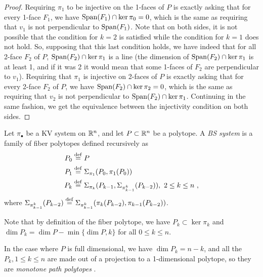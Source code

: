 \begin{proof}
    Requiring $\pi_1$ to be injective on the 1-faces of $P$ is exactly asking that for every 1-face $F_1$, we have $\operatorname{\mathrm{Span}}(F_1)\cap \ker \pi_0=0$, which is the same as requiring that $v_1$ is not perpendicular to $\operatorname{\mathrm{Span}}(F_1)$. 
    Note that on both sides, it is not possible that the condition for $k=2$ is satisfied while the condition for $k=1$ does not hold. 
    So, supposing that this last condition holds, we have indeed that for all 2-face $F_2$ of $P$, $\operatorname{\mathrm{Span}}(F_2)\cap \ker \pi_1$ is a line (the dimension of $\operatorname{\mathrm{Span}}(F_2)\cap \ker \pi_1$ is at least 1, and if it was 2 it would mean that some 1-faces of $F_2$ are perpendicular to $v_1$).
    Requiring that $\pi_1$ is injective on 2-faces of $P$ is exactly asking that for every 2-face $F_2$ of $P$, we have $\operatorname{\mathrm{Span}}(F_2)\cap \ker \pi_2=0$, which is the same as requiring that $v_2$ is not perpendicular to $\operatorname{\mathrm{Span}}(F_2)\cap \ker \pi_1$.
    Continuing in the same fashion, we get the equivalence between the injectivity condition on both sides.
\end{proof}

\begin{definition}
    Let $\pi_\bullet$ be a KV system on $\mathbb{R}^n$, and let $P\subset \mathbb{R}^n$ be a polytope. 
    A \emph{BS system} is a family of fiber polytopes defined recursively as 
    \begin{align*}
        P_0 & \stackrel{\mathrm{def}}{=} P \\
        P_1 & \stackrel{\mathrm{def}}{=} \Sigma_{\pi_1}(P_0,\pi_1(P_0)) \\
        P_k & \stackrel{\mathrm{def}}{=} \Sigma_{\pi_k}(P_{k-1},\Sigma_{\pi^{k}_{k-1}}(P_{k-2})), \ 2 \leq k \leq n \ ,
    \end{align*}
    where $\Sigma_{\pi^{k}_{k-1}}(P_{k-2})\stackrel{\mathrm{def}}{=} \Sigma_{\pi^{k}_{k-1}}(\pi_k(P_{k-2}),\pi_{k-1}(P_{k-2}))$.
\end{definition}

Note that by definition of the fiber polytope, we have $P_k \subset \ker \pi_k$ and $\dim P_k = \dim P - \min\{ \dim P,k\}$ for all $0\leq k \leq n$.

In the case where $P$ is full dimensional, we have $\dim P_k = n-k$, and all the $P_k, 1 \leq k \leq n$ are made out of a projection to a 1-dimensional polytope, so they are \emph{monotone path polytopes} \cite[Theorem 5.3]{BilleraSturmfels92}. 


